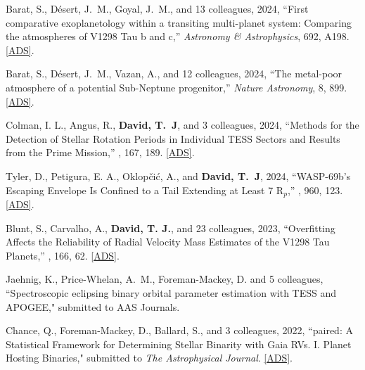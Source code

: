 \item {{Barat}, S.}, {{D{\'e}sert}, J.~M.}, {{Goyal}, J.~M.}, and 13 colleagues, 2024, ``First comparative exoplanetology within a transiting multi-planet system: Comparing the atmospheres of V1298 Tau b and c,'' \textit{Astronomy \& Astrophysics}, 692, A198. \href{https://ui.adsabs.harvard.edu/abs/2024A&A...692A.198B}{[ADS]}.

\item {{Barat}, S.}, {{D\'esert}, J.~M.}, {{Vazan}, A.}, and 12 colleagues, 2024, ``The metal-poor atmosphere of a potential Sub-Neptune progenitor,'' \textit{Nature Astronomy}, 8, 899. \href{https://ui.adsabs.harvard.edu/abs/2024NatAs...8..899B}{[ADS]}.

\item {{Colman}, I. L.}, {{Angus}, R.}, {\bf{{David}, T.~J}}, and 3 colleagues, 2024, ``{Methods for the Detection of Stellar Rotation Periods in Individual TESS Sectors and Results from the Prime Mission},'' \textit{\aj}, 167, 189. \href{https://ui.adsabs.harvard.edu/abs/2024AJ....167..189C}{[ADS]}.

\item {{Tyler}, D.}, {{Petigura}, E. A.}, {{Oklop{\v{c}}i{\'c}}, A.}, and {\bf{{David}, T.~J}}, 2024, ``{WASP-69b's Escaping Envelope Is Confined to a Tail Extending at Least 7 R$_p$},'' \textit{\apj}, 960, 123. \href{https://ui.adsabs.harvard.edu/abs/2024ApJ...960..123T}{[ADS]}.

\item {{Blunt}, S.}, {{Carvalho}, A.}, {\bf{{David}, T. J.}}, and 23 colleagues, 2023, ``{Overfitting Affects the Reliability of Radial Velocity Mass Estimates of the V1298 Tau Planets},'' \textit{\aj}, 166, 62. \href{https://ui.adsabs.harvard.edu/abs/2023AJ....166...62B}{[ADS]}.


\item {Jaehnig, K.}, {Price-Whelan, A.~M.}, {Foreman-Mackey, D.} and 5 colleagues, ``{Spectroscopic eclipsing binary orbital parameter estimation with TESS and APOGEE}," submitted to AAS Journals.

\item {{Chance}, Q., {Foreman-Mackey}, D.,  {Ballard}, S., and 3 colleagues}, 2022, ``{paired: A Statistical Framework for Determining Stellar Binarity with Gaia RVs. I. Planet Hosting Binaries}," submitted to \textit{The Astrophysical Journal}. \href{https://ui.adsabs.harvard.edu/abs/2022arXiv220611275C/abstract}{[ADS]}.


